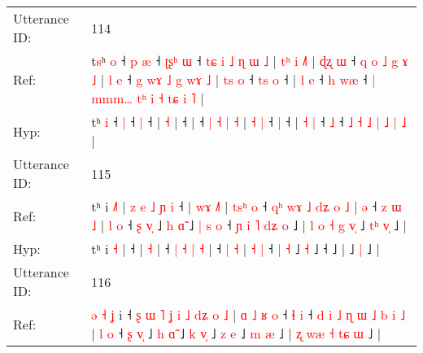 \documentclass[10pt]{article}
\DeclareRobustCommand{\hl}[1]{{\textcolor{red}{#1}}}
\begin{document}
\begin{longtable}{ll}
 \\
\midrule
Utterance ID: & 114 \\
Ref: & t\hl{s}ʰ \hl{o} ˧\hl{ }\hl{p} \hl{æ} ˧\hl{ }\hl{ʈ}\hl{ʂ}\hl{ʰ} \hl{ɯ} ˧\hl{ }\hl{t}\hl{ɕ}\hl{ }\hl{i}\hl{ }\hl{˩}\hl{ }\hl{ɳ}\hl{ }\hl{ɯ}\hl{ }\hl{˩} |\hl{ }\hl{t}\hl{ʰ}\hl{ }\hl{i} \hl{˩}\hl{˥} |\hl{ }\hl{ɖ}\hl{ʐ}\hl{ }\hl{ɯ} ˧\hl{ }\hl{q}\hl{ }\hl{o}\hl{ }\hl{˩}\hl{ }\hl{g}\hl{ }\hl{ɤ}\hl{ }\hl{˩} |\hl{ }\hl{l}\hl{ }\hl{e} ˧\hl{ }\hl{g}\hl{ }\hl{w}\hl{ɤ} \hl{˩} \hl{g} \hl{w}\hl{ɤ} \hl{˩} | \hl{t}\hl{s} \hl{o} ˧\hl{ }\hl{t}\hl{s} \hl{o} ˧ | \hl{l} \hl{e} ˧\hl{ }\hl{h} \hl{w}\hl{æ} ˧\hl{ }\hl{|} \hl{m}\hl{m}\hl{m}\hl{…} \hl{t}\hl{ʰ} \hl{i} \hl{˧} \hl{t}\hl{ɕ} \hl{i} \hl{˥} |
 \\
Hyp: & t\hl{}ʰ \hl{i} ˧\hl{}\hl{} \hl{|} ˧\hl{}\hl{}\hl{}\hl{} \hl{|} ˧\hl{}\hl{}\hl{}\hl{}\hl{}\hl{}\hl{}\hl{}\hl{}\hl{}\hl{}\hl{}\hl{} |\hl{}\hl{}\hl{}\hl{}\hl{} \hl{}\hl{˧} |\hl{}\hl{}\hl{}\hl{}\hl{} ˧\hl{}\hl{}\hl{}\hl{}\hl{}\hl{}\hl{}\hl{}\hl{}\hl{}\hl{}\hl{} |\hl{}\hl{}\hl{}\hl{} ˧\hl{}\hl{}\hl{}\hl{}\hl{} \hl{|} \hl{˧} \hl{}\hl{|} \hl{˧} | \hl{}\hl{˧} \hl{|} ˧\hl{}\hl{}\hl{} \hl{|} ˧ | \hl{˧} \hl{|} ˧\hl{}\hl{} \hl{}\hl{˩} ˧\hl{}\hl{} \hl{}\hl{}\hl{}\hl{˩} \hl{}\hl{˧} \hl{˩} \hl{|} \hl{}\hl{˩} \hl{|} \hl{˩} |
 \\
\midrule
Utterance ID: & 115 \\
Ref: & tʰ i \hl{˩}\hl{˥} |\hl{ }\hl{z}\hl{ }\hl{e}\hl{ }\hl{˩}\hl{ }\hl{ɲ}\hl{ }\hl{i} ˧ |\hl{ }\hl{w}\hl{ɤ} \hl{˩}\hl{˥} |\hl{ }\hl{t}\hl{s}\hl{ʰ}\hl{ }\hl{o} ˧\hl{ }\hl{q}\hl{ʰ}\hl{ }\hl{w}\hl{ɤ} \hl{˩} \hl{d}\hl{ʑ} \hl{o} \hl{˩} |\hl{ }\hl{ə} ˧\hl{ }\hl{z} \hl{ɯ} \hl{˩} | \hl{l} \hl{o} ˧ \hl{ʂ} \hl{v}\hl{̩} ˩\hl{ }\hl{h} \hl{ɑ}\hl{̃} ˩\hl{ }\hl{|}\hl{ }\hl{s}\hl{ }\hl{o} ˧\hl{ }\hl{ɲ}\hl{ }\hl{i}\hl{ }\hl{˥}\hl{ }\hl{d}\hl{ʑ}\hl{ }\hl{o} ˩ |\hl{ }\hl{l}\hl{ }\hl{o}\hl{ }\hl{˧}\hl{ }\hl{g}\hl{ }\hl{v}\hl{̩} ˩\hl{ }\hl{t}\hl{ʰ} \hl{v}\hl{̩} ˩ |
 \\
Hyp: & tʰ i \hl{}\hl{˧} |\hl{}\hl{}\hl{}\hl{}\hl{}\hl{}\hl{}\hl{}\hl{}\hl{} ˧ |\hl{}\hl{}\hl{} \hl{}\hl{˧} |\hl{}\hl{}\hl{}\hl{}\hl{}\hl{} ˧\hl{}\hl{}\hl{}\hl{}\hl{}\hl{} \hl{|} \hl{}\hl{˧} \hl{|} \hl{˧} |\hl{}\hl{} ˧\hl{}\hl{} \hl{|} \hl{˧} | \hl{˧} \hl{|} ˧ \hl{|} \hl{}\hl{˧} ˩\hl{}\hl{} \hl{}\hl{˧} ˩\hl{}\hl{}\hl{}\hl{}\hl{}\hl{} ˧\hl{}\hl{}\hl{}\hl{}\hl{}\hl{}\hl{}\hl{}\hl{}\hl{}\hl{} ˩ |\hl{}\hl{}\hl{}\hl{}\hl{}\hl{}\hl{}\hl{}\hl{}\hl{}\hl{} ˩\hl{}\hl{}\hl{} \hl{}\hl{|} ˩ |
 \\
\midrule
Utterance ID: & 116 \\
Ref: & \hl{ə}\hl{ }\hl{˧}\hl{ }\hl{ʝ} i ˧\hl{ }\hl{ʂ}\hl{ }\hl{ɯ}\hl{ }\hl{˥}\hl{ }\hl{ʝ}\hl{ }\hl{i}\hl{ }\hl{˩}\hl{ }\hl{d}\hl{ʑ}\hl{ }\hl{o}\hl{ }\hl{˩} |\hl{ }\hl{ɑ}\hl{ }\hl{˩}\hl{ }\hl{ʁ}\hl{ }\hl{o} ˧\hl{ }\hl{ɬ} \hl{i} ˧\hl{ }\hl{d} \hl{i} \hl{˩} \hl{ɳ} \hl{ɯ} \hl{˩} \hl{b} \hl{i} \hl{˩} | \hl{l} \hl{o} ˧ \hl{ʂ} \hl{v}\hl{̩} ˩\hl{ }\hl{h} \hl{ɑ}\hl{̃} ˩\hl{ }\hl{k} \hl{v}\hl{̩} ˩\hl{ }\hl{z} \hl{e} ˩\hl{ }\hl{m} \hl{æ} ˩ |\hl{ }\hl{ʐ}\hl{ }\hl{w}\hl{æ}\hl{ }\hl{˧}\hl{ }\hl{t}\hl{ɕ}\hl{ }\hl{ɯ} ˩ |

\end{longtable}
\end{document}
